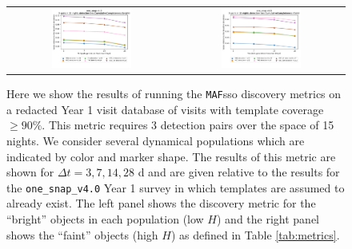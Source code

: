 \documentclass[preprintm,linenumbers]{aastex631}
\newcommand{\baseline}{\texttt{one\_snap\_v4.0}\xspace}
\newcommand{\maf}{\texttt{MAF}\xspace}
\begin{document}
		\begin{figure}
			\centering
			\begin{tabular}{c c}
				\includegraphics[width=0.5\textwidth]{results/one_snap_v4_0_n_visits_4_discovery_metric_bright.pdf} &
				\includegraphics[width=0.5\textwidth]{results/one_snap_v4_0_n_visits_4_discovery_metric_faint.pdf} \\
    			
			\end{tabular}
			\caption{Here we show the results of running the \maf \gls*{sso} discovery metrics on a redacted Year 1 visit database of visits with template coverage $\geq 90\%$.
				This metric requires 3 detection pairs over the space of 15 nights.
    We consider several dynamical populations which are indicated by color and marker shape.
				The results of this metric are shown for $\Delta t = 3, 7, 14, 28$ d and are given relative to the results for the \baseline Year 1 survey in which templates are assumed to already exist.
				The left panel shows the discovery metric for the ``bright'' objects in each population (low $H$) and the right panel shows the ``faint'' objects (high $H$) as defined in Table \ref{tab:metrics}.
			}
			\label{fig:temp_gen_discovery_metrics}
		\end{figure}
\end{document}
